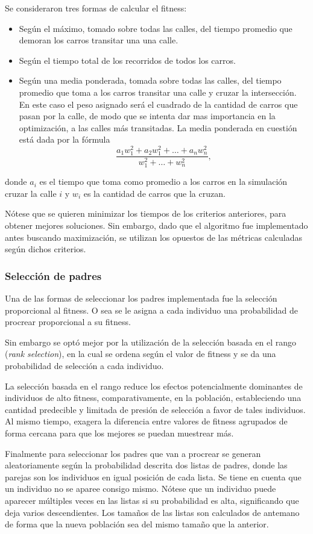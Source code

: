\documentclass[colorinlistoftodos,twoside,twocolumn]{article} %
\begin{document}
	Se consideraron tres formas de calcular el fitness:
	\begin{itemize}
		\item Seg\'un el m\'aximo, tomado sobre todas las calles, del tiempo promedio que demoran los carros transitar una una calle. 
		\item Seg\'un el tiempo total de los recorridos de todos los carros. 
		\item Seg\'un una media ponderada, tomada sobre todas las calles, del tiempo promedio que toma a los carros transitar una calle y cruzar la intersecci\'on. En este caso el peso asignado ser\'a el cuadrado de la cantidad de carros que pasan por la calle, de modo que se intenta dar mas importancia en la optimizaci\'on, a las calles m\'as transitadas. La media ponderada en cuesti\'on est\'a dada por la f\'ormula
		\[ \frac{a_1w_1^2 + a_2w_1^2 + \dots + a_nw_n^2}{w_1^2 + \dots + w_n^2},\]
	\end{itemize}
	donde $a_i$ es el tiempo que toma como promedio a los carros en la simulaci\'on cruzar la calle $i$ y $w_i$ es la cantidad de carros que la cruzan.

	N\'otese que se quieren minimizar los tiempos de los criterios anteriores, para obtener mejores soluciones. Sin embargo, dado que el algoritmo fue implementado antes buscando maximizaci\'on, se utilizan los opuestos de las m\'etricas calculadas seg\'un dichos criterios.
	
	\subsubsection{Selección de padres}
	Una de las formas de seleccionar los padres implementada fue la selecci\'on proporcional al fitness. O sea se le asigna a cada individuo una probabilidad de procrear proporcional a su fitness.
	
	Sin embargo se opt\'o mejor por la utilizaci\'on de la selección basada en el rango (\textit{rank selection}), en la cual se ordena según el valor de fitness y se da una probabilidad de selección a cada individuo. 
	
	La selección basada en el rango reduce los efectos potencialmente dominantes de individuos de alto fitness, comparativamente, en la población, estableciendo una cantidad predecible y limitada de presión de selección a favor de tales individuos. Al mismo tiempo, exagera la diferencia entre valores de fitness agrupados de forma cercana para que los mejores se puedan muestrear más.
	
	Finalmente para seleccionar los padres que van a procrear se generan aleatoriamente seg\'un la probabilidad descrita dos listas de padres, donde las parejas son los individuos en igual posici\'on de cada lista. Se tiene en cuenta que un individuo no se aparee consigo mismo. N\'otese que un individuo puede aparecer m\'ultiples veces en las listas si su probabilidad es alta, significando que deja varios descendientes. Los tama\~nos de las listas son calculados de antemano de forma que la nueva poblaci\'on sea del mismo tama\~no que la anterior.
	
\end{document}
